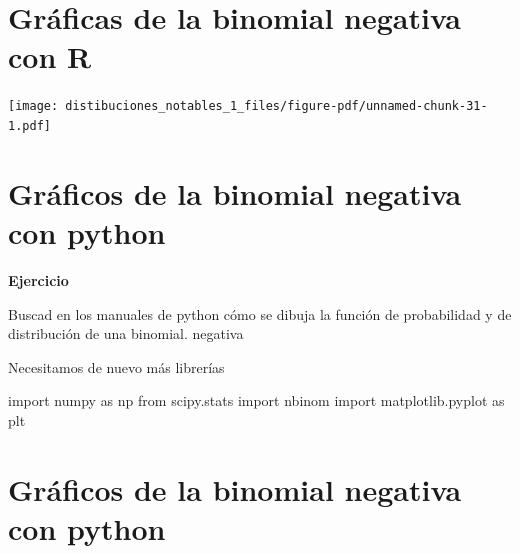 \documentclass[
  letterpaper,
  DIV=11,
  numbers=noendperiod]{scrreprt}
\newenvironment{Shaded}{\begin{snugshade}}{\end{snugshade}}
\newcommand{\ImportTok}[1]{\textcolor[rgb]{0.00,0.46,0.62}{#1}}
\newcommand{\NormalTok}[1]{\textcolor[rgb]{0.00,0.23,0.31}{#1}}
\begin{document}
\section{Gráficas de la binomial negativa con
R}\label{gruxe1ficas-de-la-binomial-negativa-con-r-1}

\begin{center}
\texttt{[image: distibuciones\_notables\_1\_files/figure-pdf/unnamed-chunk-31-1.pdf]}
\end{center}

\section{Gráficos de la binomial negativa con
python}\label{gruxe1ficos-de-la-binomial-negativa-con-python}

\textbf{Ejercicio}

Buscad en los manuales de python cómo se dibuja la función de
probabilidad y de distribución de una binomial. negativa

Necesitamos de nuevo más librerías

\begin{Shaded}
\begin{Highlighting}[]
\ImportTok{import}\NormalTok{ numpy }\ImportTok{as}\NormalTok{ np}
\ImportTok{from}\NormalTok{ scipy.stats }\ImportTok{import}\NormalTok{ nbinom}
\ImportTok{import}\NormalTok{ matplotlib.pyplot }\ImportTok{as}\NormalTok{ plt}
\end{Highlighting}
\end{Shaded}

\section{Gráficos de la binomial negativa con
python}\label{gruxe1ficos-de-la-binomial-negativa-con-python-1}
\end{document}
